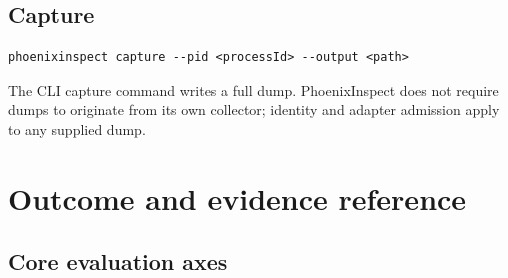 \documentclass[11pt,oneside,openany]{book}
\begin{document}
\section{Capture}

\begin{lstlisting}[language={},numbers=none]
phoenixinspect capture --pid <processId> --output <path>
\end{lstlisting}

The CLI capture command writes a full dump. PhoenixInspect does not require dumps to originate from its own collector; identity and adapter admission apply to any supplied dump.

\chapter{Outcome and evidence reference}
\label{app:outcomes}

\section{Core evaluation axes}
\end{document}
